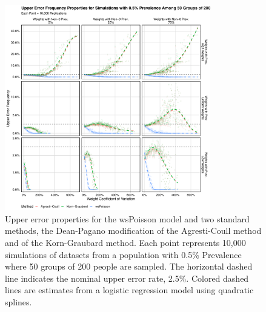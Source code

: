 \documentclass[AMA,STIX1COL]{WileyNJD-v2}
\begin{document}
\begin{figure}
\centering
\includegraphics[width=0.8\textwidth]{figures/perfect_upper_error_frequency_50_groups_0_005_prev.pdf}
\caption{Upper error properties for the wsPoisson model and two standard methods, the Dean-Pagano modification of the Agresti-Coull method and of the Korn-Graubard method.
Each point represents 10,000 simulations of datasets from a population with 0.5\% Prevalence where 50 groups of 200 people are sampled.
The horizontal dashed line indicates the nominal upper error rate, 2.5\%.
Colored dashed lines are estimates from a logistic regression model using quadratic splines.}
\label{fig:perfect_upper_error_frequency_50_groups_0_005_prev}
\end{figure}
\end{document}
